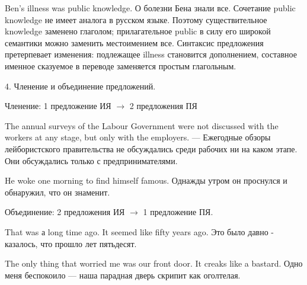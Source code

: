 Ben's illness was public knowledge. О болезни Бена знали все. Сочетание public knowledge не имеет аналога в русском языке. Поэтому существительное knowledge заменено глаголом; прилагательное public в силу его широкой семантики можно заменить местоимением все. Синтаксис предложения претерпевает изменения: подлежащее illness становится дополнением, составное именное сказуемое в переводе заменяется простым глагольным.

4. Членение и объединение предложений.

Членение: 1 предложение ИЯ $\rightarrow$ 2 предложения ПЯ

The annual surveys of the Labour Government were not discussed with the workers at any stage, but only with the employers. --- Ежегодные обзоры лейбористского правительства не обсуждались среди рабочих ни на каком этапе. Они обсуждались только с предпринимателями.

He woke one morning to find himself famous. Однажды утром он проснулся и обнаружил, что он знаменит.

Объединение: 2 предложения ИЯ $\rightarrow$ 1 предложение ПЯ.

That was а long time ago. It seemed like fifty years ago. Это было давно - казалось, что прошло лет пятьдесят.

The only thing that worried me was our front door. It creaks like a bastard. Одно меня беспокоило --- наша парадная дверь скрипит как оголтелая.